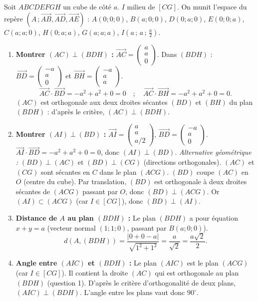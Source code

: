 \documentclass[11pt]{article}
\begin{document}
\begin{corrige}
Soit $ABCDEFGH$ un cube de côté $a$. $I$ milieu de $[CG]$. On munit l'espace du repère $(A\,;\overrightarrow{AB},\overrightarrow{AD},\overrightarrow{AE})$ : $A(0;0;0)$, $B(a;0;0)$, $D(0;a;0)$, $E(0;0;a)$, $C(a;a;0)$, $H(0;a;a)$, $G(a;a;a)$, $I(a\,;\,a\,;\,\frac{a}{2})$.
\begin{enumerate}
\item \textbf{Montrer $(AC) \perp (BDH)$ :} $\overrightarrow{AC}=\begin{pmatrix}a\\a\\0\end{pmatrix}$. Dans $(BDH)$ : $\overrightarrow{BD}=\begin{pmatrix}-a\\a\\0\end{pmatrix}$ et $\overrightarrow{BH}=\begin{pmatrix}-a\\a\\a\end{pmatrix}$.
\[ \overrightarrow{AC}\cdot\overrightarrow{BD} = -a^2+a^2+0 = 0 \quad;\quad \overrightarrow{AC}\cdot\overrightarrow{BH} = -a^2+a^2+0 = 0. \]
$(AC)$ est orthogonale aux deux droites sécantes $(BD)$ et $(BH)$ du plan $(BDH)$ : d'après le critère, $(AC)\perp(BDH)$.
\item \textbf{Montrer $(AI) \perp (BD)$ :} $\overrightarrow{AI}=\begin{pmatrix}a\\a\\a/2\end{pmatrix}$, $\overrightarrow{BD}=\begin{pmatrix}-a\\a\\0\end{pmatrix}$. $\overrightarrow{AI}\cdot\overrightarrow{BD} = -a^2+a^2+0 = 0$, donc $(AI)\perp(BD)$.
\emph{Alternative géométrique :} $(BD)\perp(AC)$ et $(BD)\perp(CG)$ (directions orthogonales). $(AC)$ et $(CG)$ sont sécantes en $C$ dans le plan $(ACG)$. $(BD)$ coupe $(AC)$ en $O$ (centre du cube). Par translation, $(BD)$ est orthogonale à deux droites sécantes de $(ACG)$ passant par $O$, donc $(BD)\perp(ACG)$. Or $(AI)\subset(ACG)$ (car $I\in[CG]$), donc $(BD)\perp(AI)$.
\item \textbf{Distance de $A$ au plan $(BDH)$ :} Le plan $(BDH)$ a pour équation $x+y=a$ (vecteur normal $(1;1;0)$, passant par $B(a;0;0)$).
\[ d(A,(BDH)) = \frac{|0+0-a|}{\sqrt{1^2+1^2}} = \frac{a}{\sqrt{2}} = \frac{a\sqrt{2}}{2}. \]
\item \textbf{Angle entre $(AIC)$ et $(BDH)$ :} Le plan $(AIC)$ est le plan $(ACG)$ (car $I\in[CG]$). Il contient la droite $(AC)$ qui est orthogonale au plan $(BDH)$ (question 1). D'après le critère d'orthogonalité de deux plans, $(AIC)\perp(BDH)$. L'angle entre les plans vaut donc $90^\circ$.
\end{enumerate}
\end{corrige}
\end{document}
